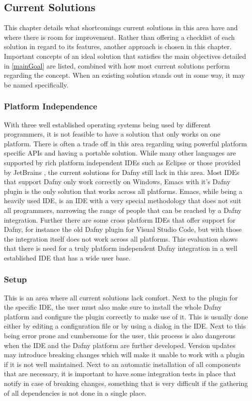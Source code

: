 \subsection{Current Solutions}\label{cursol}
This chapter details what shortcomings current solutions in this area have and where there is room for improvement. Rather than offering a checklist of each solution in regard to its features, another approach is chosen in this chapter. Important concepts of an ideal solution that satisfies the main objectives detailed in \ref{mainGoal} are listed, combined with how most current solutions perform regarding the concept. When an existing solution stands out in some way, it may be named specifically. 
\subsubsection{Platform Independence}
With three well established operating systems being used by different programmers, it is not feasible to have a solution that only works on one platform. There is often a trade off in this area regarding using powerful platform specific APIs and having a portable solution. While many other languages are supported by rich platform independent IDEs such as Eclipse \cite{eclipse} or those provided by JetBrains \cite{jetbrains}, the current solutions for Dafny still lack in this area. \newline
Most IDEs that support Dafny only work correctly on Windows, Emacs \cite{GNU} with it's Dafny plugin is the only solution that works across all platforms. Emacs, while being a heavily used IDE, is an IDE with a very special methodology that does not suit all programmers, narrowing the range of people that can be reached by a Dafny integration. Further there are some cross platform IDEs that offer support for Dafny, for instance the old Dafny plugin for Visual Studio Code, but with those the integration itself does not work across all platforms. \newline
This evaluation shows that there is need for a truly platform independent Dafny integration in a well established IDE that has a wide user base.
\subsubsection{Setup}
This is an area where all current solutions lack comfort. Next to the plugin for the specific IDE, the user must also make sure to install the whole Dafny platform and configure the plugin correctly to make use of it. This is usually done either by editing a configuration file or by using a dialog in the IDE. Next to this being error prone and cumbersome for the user, this process is also dangerous when the IDE and the Dafny platform are further developed. Version updates may introduce breaking changes which will make it unable to work with a plugin if it is not well maintained. \newline
Next to an automatic installation of all components that are necessary, it is important to have some integration tests in place that notify in case of breaking changes, something that is very difficult if the gathering of all dependencies is not done in a single place.
